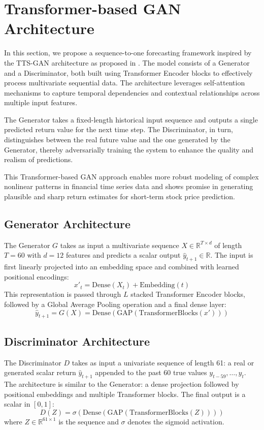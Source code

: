 
\section{Transformer-based GAN Architecture}

In this section, we propose a sequence-to-one forecasting framework inspired by the TTS-GAN architecture as proposed in \cite{yoon_time-series_2019}. The model consists of a Generator and a Discriminator, both built using Transformer Encoder blocks to effectively process multivariate sequential data. The architecture leverages self-attention mechanisms to capture temporal dependencies and contextual relationships across multiple input features.

The Generator takes a fixed-length historical input sequence and outputs a single predicted return value for the next time step. The Discriminator, in turn, distinguishes between the real future value and the one generated by the Generator, thereby adversarially training the system to enhance the quality and realism of predictions.

This Transformer-based GAN approach enables more robust modeling of complex nonlinear patterns in financial time series data and shows promise in generating plausible and sharp return estimates for short-term stock price prediction.
\subsection{Generator Architecture}

The Generator $G$ takes as input a multivariate sequence $X \in \mathbb{R}^{T \times d}$ of length $T=60$ with $d=12$ features and predicts a scalar output $\hat{y}_{t+1} \in \mathbb{R}$. The input is first linearly projected into an embedding space and combined with learned positional encodings:
\[
x'_t = \text{Dense}(X_t) + \text{Embedding}(t)
\]
This representation is passed through $L$ stacked Transformer Encoder blocks, followed by a Global Average Pooling operation and a final dense layer:
\[
\hat{y}_{t+1} = G(X) = \text{Dense}(\text{GAP}(\text{TransformerBlocks}(x')))
\]

\subsection{Discriminator Architecture}

The Discriminator $D$ takes as input a univariate sequence of length 61: a real or generated scalar return $\hat{y}_{t+1}$ appended to the past 60 true values $y_{t-59}, \dots, y_t$. The architecture is similar to the Generator: a dense projection followed by positional embeddings and multiple Transformer blocks. The final output is a scalar in $[0, 1]$:
\[
D(Z) = \sigma(\text{Dense}(\text{GAP}(\text{TransformerBlocks}(Z))))
\]
where $Z \in \mathbb{R}^{61 \times 1}$ is the sequence and $\sigma$ denotes the sigmoid activation.

